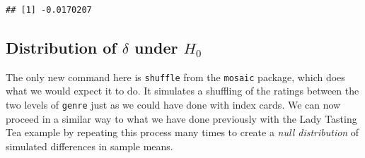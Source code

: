 \documentclass[]{tufte-book}
\newenvironment{Shaded}{\begin{snugshade}}{\end{snugshade}}
\newcommand{\KeywordTok}[1]{\textcolor[rgb]{0.13,0.29,0.53}{\textbf{{#1}}}}
\newcommand{\DataTypeTok}[1]{\textcolor[rgb]{0.13,0.29,0.53}{{#1}}}
\newcommand{\DecValTok}[1]{\textcolor[rgb]{0.00,0.00,0.81}{{#1}}}
\newcommand{\StringTok}[1]{\textcolor[rgb]{0.31,0.60,0.02}{{#1}}}
\newcommand{\NormalTok}[1]{{#1}}
\begin{document}
\begin{Shaded}
\end{Shaded}

\begin{verbatim}
## [1] -0.0170207
\end{verbatim}

\subsection{\texorpdfstring{Distribution of \(\delta\) under
\(H_0\)}{Distribution of \textbackslash{}delta under H\_0}}\label{distribution-of-delta-under-h_0-1}

The only new command here is \texttt{shuffle} from the \texttt{mosaic}
package, which does what we would expect it to do. It simulates a
shuffling of the ratings between the two levels of \texttt{genre} just
as we could have done with index cards. We can now proceed in a similar
way to what we have done previously with the Lady Tasting Tea example by
repeating this process many times to create a \emph{null distribution}
of simulated differences in sample means.

\begin{Shaded}
\end{Shaded}
\end{document}
